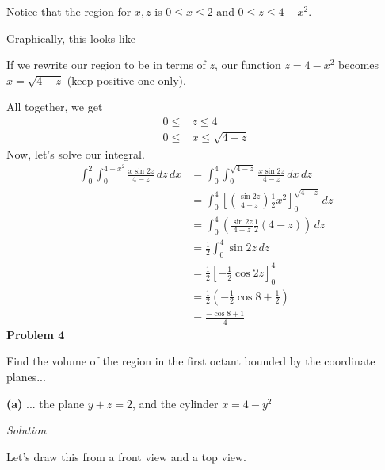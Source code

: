 \documentclass{article}
\newcommand{\lrp}[1]{\left( #1 \right)}
\newcommand{\lrb}[1]{\left[ #1 \right]}
\newcommand{\Solution}{\textit{Solution}}
\begin{document}
Notice that the region for $x,z$ is $0\leq x\leq2$ and $0\leq z\leq 4-x^2$.

Graphically, this looks like
\begin{center}
\end{center}
If we rewrite our region to be in terms of $z$, our function $z=4-x^2$ becomes $x=\sqrt{4-z}$ (keep positive one only).

All together, we get
\begin{align*}
    0\leq &z \leq 4\\
    0\leq &x \leq \sqrt{4-z}
\end{align*}
Now, let's solve our integral.
\begin{align*}
    \int_0^2\int_0^{4-x^2}\frac{x\sin 2z}{4-z}\,dz\,dx&=\int_0^4\int_0^{\sqrt{4-z}}\frac{x\sin 2z}{4-z}\,dx\,dz\\
    &=\int_0^4\lrb{\lrp{\frac{\sin 2z}{4-z}}\frac{1}{2}x^2}_0^{\sqrt{4-z}}\,dz\\
    &=\int_0^4\lrp{\frac{\sin 2z}{4-z}\frac{1}{2}\lrp{4-z}}\,dz\\
    &=\frac{1}{2}\int_0^4\sin 2z\,dz\\
    &=\frac{1}{2}\lrb{-\frac{1}{2}\cos 2z}_0^4\\
    &=\frac{1}{2}\lrp{-\frac{1}{2}\cos 8 +\frac{1}{2}}\\
    &=\boxed{\frac{-\cos 8+1}{4}}
\end{align*}
\textbf{Problem 4}

Find the volume of the region in the first octant bounded by the coordinate planes...

\textbf{(a)} ... the plane $y+z=2$, and the cylinder $x=4-y^2$

\Solution

Let's draw this from a front view and a top view. 
\end{document}
